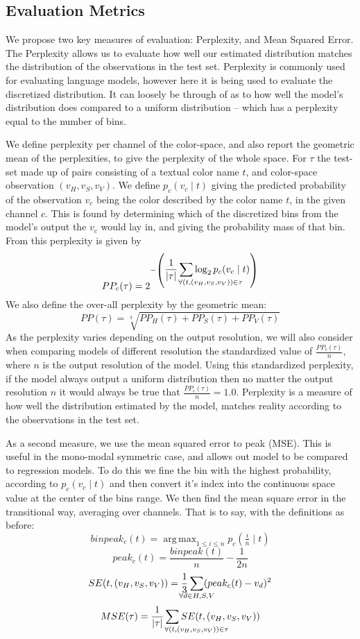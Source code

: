 \documentclass[11pt,letterpaper]{article}
\DeclareMathOperator*{\argmax}{arg\,max}
\begin{document}
\subsection{Evaluation Metrics}
We propose two key measures of evaluation: Perplexity, and Mean Squared Error.
The Perplexity allows us to evaluate how well our estimated distribution matches the distribution of the observations in the test set.
Perplexity is commonly used for evaluating language models, however here it is being used to evaluate the discretized distribution.
It can loosely be through of as to how well the model's distribution does compared to a uniform distribution -- which has a perplexity equal to the number of bins.


We define perplexity per channel of the color-space, and also report the geometric mean of the perplexities, to give the perplexity of the whole space.
For $\tau$ the test-set made up of pairs consisting of a textual color name $t$, and color-space observation $(v_{H}, v_{S}, v_{V})$.
We define $p_{c}(v_{c}\mid t)$ giving the predicted probability of the observation $v_{c}$ being the color described by the color name $t$, in the given channel ${c}$.
This is found by determining which of the discretized bins from the model's output the $v_{c}$ would lay in, and giving the probability mass of that bin.
From this perplexity is given by
\[
 PP_{c}(\tau) = 2^{-\left(
 	\displaystyle\frac{1}{|\tau|} 
 	\displaystyle\sum_{\mathclap{\qquad\qquad\quad
	 		\forall(t,(v_{H}, v_{S}, v_{V})) \in \tau}}
 	 \log_2 p_{c}(v_{c}\mid t)\right)}
\]
We also define the over-all perplexity by the geometric mean: 
\[
PP(\tau) = \sqrt[3]{PP_H(\tau)+PP_S(\tau)+PP_V(\tau)}
\]
As the perplexity varies depending on the output resolution,
we will also consider when comparing models of different resolution the standardized value of $\frac{PP_c(\tau)}{n}$, where $n$ is the output resolution of the model.
Using this standardized perplexity, if the model always output a uniform distribution then no matter the output resolution $n$ it would always be true that  $\frac{PP_c(\tau)}{n}=1.0$.
Perplexity is a measure of how well the distribution estimated by the model, matches reality according to the observations in the test set.


As a second measure, we use the mean squared error to peak (MSE).
This is useful in the mono-modal symmetric case, and allows out model to be compared to regression models.
To do this we fine the bin with the highest probability, according to $p_c(v_c\mid t)$ and then convert it's index into the continuous space value at the center of the bins range.
We then find the mean square error in the transitional way, averaging over channels.
That is to say, with the definitions as before:
\[
binpeak_c(t)=\argmax_{1\le i \le n}{p_c\left(\tfrac{i}{n} \mid t\right)}
\]
\[
peak_c(t)=\frac{binpeak(t)}{n} - \frac{1}{2n}
\]
\[
SE(t, (v_{H}, v_{S}, v_{V})) = \frac{1}{3}
	\sum_{\mathclap{\forall d\in{H,S,V}}} (peak_c(t) - v_d)^2
\]
\[
MSE(\tau) =\frac{1}{|\tau|}
	\sum_{\mathclap{\qquad\qquad\quad
		\forall(t,(v_{H}, v_{S}, v_{V})) \in \tau}}
	 SE(t,(v_{H}, v_{S}, v_{V}))
\]
\end{document}
